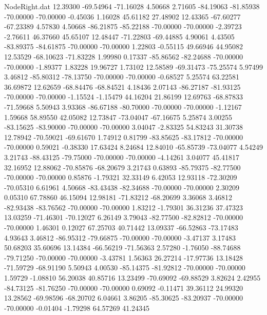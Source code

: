 \begin{filecontents}{NodeRight.dat}
  12.39300  -69.54964  -71.16028     4.50668    2.71605  -84.19063  -81.85938  -70.00000  -70.00000   -0.45036    1.16028   45.61182   27.48902
  12.43365  -67.60277  -67.23389     4.57830    4.50668  -86.21875  -85.22188  -70.00000  -70.00000   -2.39723   -2.76611   46.37660   45.65107
  12.48447  -71.22803  -69.44885     4.90061    4.43505  -83.89375  -84.61875  -70.00000  -70.00000    1.22803   -0.55115   49.66946   44.95082
  12.53529  -68.10623  -71.83228     1.99980    0.17337  -85.86562  -82.24688  -70.00000  -70.00000   -1.89377    1.83228   19.96727    1.73102
  12.58589  -69.31473  -75.25574     5.97499    3.46812  -85.80312  -78.13750  -70.00000  -70.00000   -0.68527    5.25574   63.22581   36.69872
  12.62659  -68.84476  -68.84521     4.18436    2.07143  -86.27187  -81.93125  -70.00000  -70.00000   -1.15524   -1.15479   44.16204   21.86199
  12.69763  -68.87833  -71.59668     5.50943    3.93368  -86.67188  -80.70000  -70.00000  -70.00000   -1.12167    1.59668   58.89550   42.05082
  12.73847  -73.04047  -67.16675     5.25874    3.00255  -83.15625  -83.90000  -70.00000  -70.00000    3.04047   -2.83325   54.83243   31.30738
  12.78942  -70.59021  -69.61670     1.74912    0.81799  -83.85625  -83.17812  -70.00000  -70.00000    0.59021   -0.38330   17.63424    8.24684
  12.84010  -65.85739  -73.04077     4.54249    3.21743  -88.43125  -79.75000  -70.00000  -70.00000   -4.14261    3.04077   45.41817   32.16952
  12.88062  -70.85876  -68.20679     3.21743    0.63893  -85.79375  -82.77500  -70.00000  -70.00000    0.85876   -1.79321   32.33149    6.42053
  12.93118  -72.30209  -70.05310     6.61961    4.50668  -83.43438  -82.34688  -70.00000  -70.00000    2.30209    0.05310   67.78860   46.15094
  12.98181  -71.83212  -68.20699     3.36068    3.46812  -82.93438  -83.76562  -70.00000  -70.00000    1.83212   -1.79301   36.31236   37.47323
  13.03259  -71.46301  -70.12027     6.26149    3.79043  -82.77500  -82.82812  -70.00000  -70.00000    1.46301    0.12027   67.25703   40.71442
  13.09337  -66.52863  -73.17483     4.93643    3.46812  -86.95312  -79.66875  -70.00000  -70.00000   -3.47137    3.17483   50.68203   35.60696
  13.14384  -66.56219  -71.56363     2.57280   -1.76050  -88.74688  -79.71250  -70.00000  -70.00000   -3.43781    1.56363   26.27214  -17.97736
  13.18428  -71.59729  -68.91190     5.50943    4.00530  -85.14375  -81.92812  -70.00000  -70.00000    1.59729   -1.08810   56.20038   40.85716
  13.23499  -70.69092  -69.88529     3.82624    2.42955  -84.73125  -81.76250  -70.00000  -70.00000    0.69092   -0.11471   39.36112   24.99320
  13.28562  -69.98596  -68.20702     6.04661    3.86205  -85.30625  -83.20937  -70.00000  -70.00000   -0.01404   -1.79298   64.57269   41.24345

\end{filecontents}
